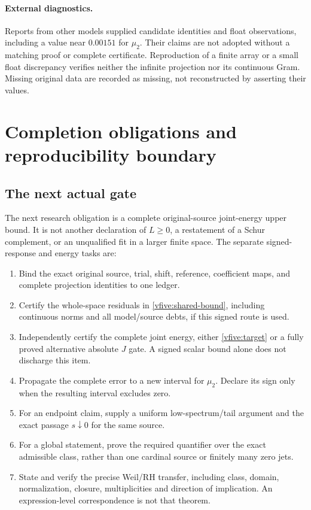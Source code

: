 \documentclass[11pt,a4paper]{article}
\numberwithin{equation}{section}
\theoremstyle{definition}\newtheorem{definition}[theorem]{Definition}
\theoremstyle{remark}\newtheorem{remark}[theorem]{Remark}
\begin{document}
\paragraph{External diagnostics.} Reports from other models supplied candidate identities and float observations, including a value near $0.00151$ for $\mu_2$. Their claims are not adopted without a matching proof or complete certificate. Reproduction of a finite array or a small float discrepancy verifies neither the infinite projection nor its continuous Gram. Missing original data are recorded as missing, not reconstructed by asserting their values.

\section{Completion obligations and reproducibility boundary}\label{vfive:open}
\subsection{The next actual gate}
The next research obligation is a complete original-source joint-energy upper bound. It is not another declaration of $L\geq0$, a restatement of a Schur complement, or an unqualified fit in a larger finite space. The separate signed-response and energy tasks are:
\begin{enumerate}
\item Bind the exact original source, trial, shift, reference, coefficient maps, and complete projection identities to one ledger.
\item Certify the whole-space residuals in \eqref{vfive:shared-bound}, including continuous norms and all model/source debts, if this signed route is used.
\item Independently certify the complete joint energy, either \eqref{vfive:target} or a fully proved alternative absolute $J$ gate. A signed scalar bound alone does not discharge this item.
\item Propagate the complete error to a new interval for $\mu_2$. Declare its sign only when the resulting interval excludes zero.
\item For an endpoint claim, supply a uniform low-spectrum/tail argument and the exact passage $s\downarrow0$ for the same source.
\item For a global statement, prove the required quantifier over the exact admissible class, rather than one cardinal source or finitely many zero jets.
\item State and verify the precise Weil/RH transfer, including class, domain, normalization, closure, multiplicities and direction of implication. An expression-level correspondence is not that theorem.
\end{enumerate}
\end{document}
